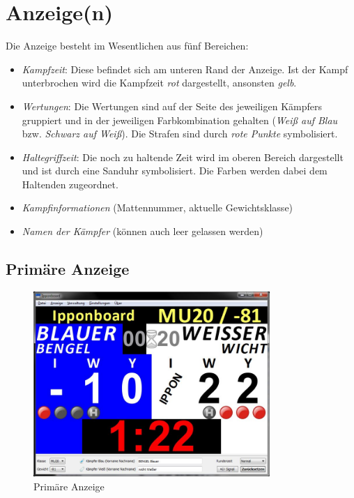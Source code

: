 ﻿\documentclass[11pt,numbers=noenddot]{scrreprt}
\begin{document}
\section{Anzeige(n)}
Die Anzeige besteht im Wesentlichen aus fünf Bereichen:
\begin{itemize}
	\item \textit{Kampfzeit}: Diese befindet sich am unteren Rand der Anzeige. Ist der Kampf unterbrochen wird die Kampfzeit \textit{rot} dargestellt, ansonsten \textit{gelb}.
	\item \textit{Wertungen}: Die Wertungen sind auf der Seite des jeweiligen Kämpfers gruppiert und in der jeweiligen Farbkombination gehalten (\textit{Weiß auf Blau} bzw.\textit{ Schwarz auf Weiß}). Die Strafen sind durch \textit{rote Punkte} symbolisiert.
	\item \textit{Haltegriffzeit}: Die noch zu haltende Zeit wird im oberen Bereich dargestellt und ist durch eine Sanduhr symbolisiert. Die Farben werden dabei dem Haltenden zugeordnet.
	\item \textit{Kampfinformationen} (Mattennummer, aktuelle Gewichtsklasse)
	\item \textit{Namen der Kämpfer} (können auch leer gelassen werden)
\end{itemize}

\subsection[Primäre Anzeige]{Primäre Anzeige}

\begin{figure}
	\centering
		\includegraphics[width=0.8\textwidth]{images/primary_view-DE.jpg}
	\caption{Primäre Anzeige}
	\label{fig:Primary_View}
\end{figure}
\end{document}
